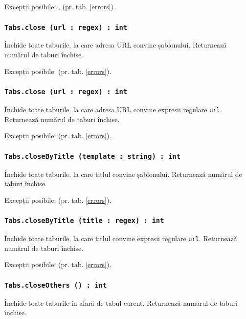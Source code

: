 Excepții posibile: ,  (pr. tab. \ref{errors}).

\subsubsection{\texttt{Tabs.close (url : regex) : int}}

Închide toate taburile, la care adresa URL convine șablonului. Returnează numărul de taburi închise.

Excepții posibile:  (pr. tab. \ref{errors}).

\subsubsection{\texttt{Tabs.close (url : regex) : int}}

Închide toate taburile, la care adresa URL convine expresii regulare \texttt{url}. Returnează numărul de taburi închise.

Excepții posibile:  (pr. tab. \ref{errors}).

\subsubsection{\texttt{Tabs.closeByTitle (template : string) : int}}

Închide toate taburile, la care titlul convine șablonului. Returnează numărul de taburi închise.

Excepții posibile:  (pr. tab. \ref{errors}).

\subsubsection{\texttt{Tabs.closeByTitle (title : regex) : int}}

Închide toate taburile, la care titlul convine expresii regulare \texttt{url}. Returnează numărul de taburi închise.

Excepții posibile:  (pr. tab. \ref{errors}).

\subsubsection{\texttt{Tabs.closeOthers () : int}}

Închide toate taburile în afară de tabul curent. Returnează numărul de taburi închise.


